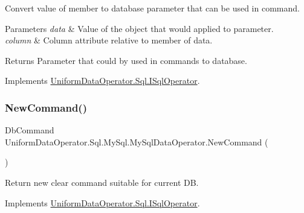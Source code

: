 Convert value of member to database parameter that can be used in command. 


\begin{DoxyParams}{Parameters}
{\em data} & Value of the object that would applied to parameter.\\
\hline
{\em column} & Column attribute relative to member of data.\\
\hline
\end{DoxyParams}
\begin{DoxyReturn}{Returns}
Parameter that could by used in commands to database.
\end{DoxyReturn}


Implements \mbox{\hyperlink{interface_uniform_data_operator_1_1_sql_1_1_i_sql_operator_ac09f73e97974a4bd697046e0c54a93d3}{Uniform\+Data\+Operator.\+Sql.\+I\+Sql\+Operator}}.

\mbox{\label{class_uniform_data_operator_1_1_sql_1_1_my_sql_1_1_my_sql_data_operator_af5850bfb38f7dfcd5acd5157458ef4bd}} 
\subsubsection{\texorpdfstring{New\+Command()}{NewCommand()}\hspace{0.1cm}{\footnotesize\ttfamily [1/2]}}
{\footnotesize\ttfamily Db\+Command Uniform\+Data\+Operator.\+Sql.\+My\+Sql.\+My\+Sql\+Data\+Operator.\+New\+Command (\begin{DoxyParamCaption}{ }\end{DoxyParamCaption})}



Return new clear command suitable for current DB. 



Implements \mbox{\hyperlink{interface_uniform_data_operator_1_1_sql_1_1_i_sql_operator_afc0fd8b8c82515c498a6959453f331f1}{Uniform\+Data\+Operator.\+Sql.\+I\+Sql\+Operator}}.

\mbox{\label{class_uniform_data_operator_1_1_sql_1_1_my_sql_1_1_my_sql_data_operator_a6c2e2d374072c275953a515379963881}} 
